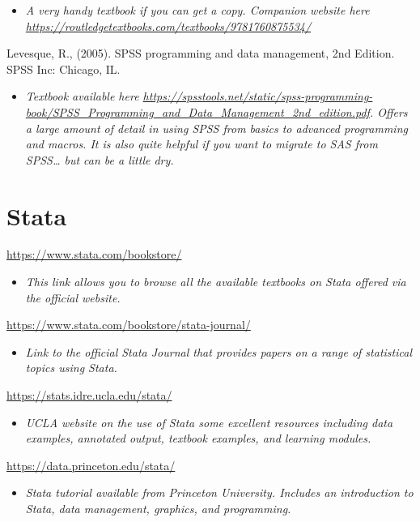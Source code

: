 \documentclass[
]{book}
\providecommand{\tightlist}{%
  \setlength{\itemsep}{0pt}\setlength{\parskip}{0pt}}
\begin{document}
\begin{itemize}
\tightlist
\item
  \emph{A very handy textbook if you can get a copy. Companion website here \url{https://routledgetextbooks.com/textbooks/9781760875534/}}
\end{itemize}

Levesque, R., (2005). SPSS programming and data management, 2nd Edition. SPSS Inc: Chicago, IL.

\begin{itemize}
\tightlist
\item
  \emph{Textbook available here \url{https://spsstools.net/static/spss-programming-book/SPSS_Programming_and_Data_Management_2nd_edition.pdf}. Offers a large amount of detail in using SPSS from basics to advanced programming and macros. It is also quite helpful if you want to migrate to SAS from SPSS\ldots{} but can be a little dry.}
\end{itemize}

\section{Stata}\label{stata}

\url{https://www.stata.com/bookstore/}

\begin{itemize}
\tightlist
\item
  \emph{This link allows you to browse all the available textbooks on Stata offered via the official website.}
\end{itemize}

\url{https://www.stata.com/bookstore/stata-journal/}

\begin{itemize}
\tightlist
\item
  \emph{Link to the official Stata Journal that provides papers on a range of statistical topics using Stata.}
\end{itemize}

\url{https://stats.idre.ucla.edu/stata/}

\begin{itemize}
\tightlist
\item
  \emph{UCLA website on the use of Stata some excellent resources including data examples, annotated output, textbook examples, and learning modules.}
\end{itemize}

\url{https://data.princeton.edu/stata/}

\begin{itemize}
\tightlist
\item
  \emph{Stata tutorial available from Princeton University. Includes an introduction to Stata, data management, graphics, and programming.}
\end{itemize}
\end{document}
